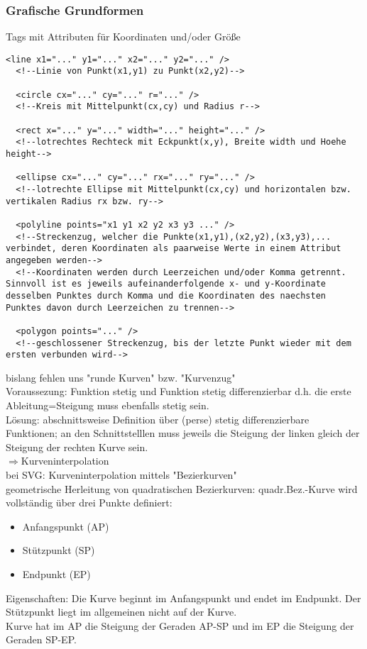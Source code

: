\subsubsection{Grafische Grundformen}
Tags mit Attributen für Koordinaten und/oder Größe
\begin{lstlisting}[caption={Syntax von grafischen Grundformen in SVG}, label={lst:Grundger:SVG}, language={SVG}]
  <line x1="..." y1="..." x2="..." y2="..." />
  <!--Linie von Punkt(x1,y1) zu Punkt(x2,y2)-->
  
  <circle cx="..." cy="..." r="..." />
  <!--Kreis mit Mittelpunkt(cx,cy) und Radius r-->
  
  <rect x="..." y="..." width="..." height="..." />
  <!--lotrechtes Rechteck mit Eckpunkt(x,y), Breite width und Hoehe height-->
  
  <ellipse cx="..." cy="..." rx="..." ry="..." />
  <!--lotrechte Ellipse mit Mittelpunkt(cx,cy) und horizontalen bzw. vertikalen Radius rx bzw. ry-->
  
  <polyline points="x1 y1 x2 y2 x3 y3 ..." />
  <!--Streckenzug, welcher die Punkte(x1,y1),(x2,y2),(x3,y3),... verbindet, deren Koordinaten als paarweise Werte in einem Attribut angegeben werden-->
  <!--Koordinaten werden durch Leerzeichen und/oder Komma getrennt. Sinnvoll ist es jeweils aufeinanderfolgende x- und y-Koordinate desselben Punktes durch Komma und die Koordinaten des naechsten Punktes davon durch Leerzeichen zu trennen-->
  
  <polygon points="..." />
  <!--geschlossener Streckenzug, bis der letzte Punkt wieder mit dem ersten verbunden wird-->
\end{lstlisting}
bislang fehlen uns "runde Kurven" bzw. "Kurvenzug"\\
Voraussezung: Funktion stetig und Funktion stetig differenzierbar d.h. die erste Ableitung=Steigung muss ebenfalls stetig sein.\\
Lösung: abschnittsweise Definition über (perse) stetig differenzierbare Funktionen; an den Schnittstelllen muss jeweils die Steigung der linken gleich der Steigung der rechten Kurve sein.\\
$\Rightarrow$Kurveninterpolation\\
bei SVG: Kurveninterpolation mittels "Bezierkurven"\\
geometrische Herleitung von quadratischen Bezierkurven:
quadr.Bez.-Kurve wird vollständig über drei Punkte definiert:
\begin{itemize}
\item Anfangspunkt (AP)
\item Stützpunkt (SP)
\item Endpunkt (EP)
\end{itemize}
Eigenschaften: Die Kurve beginnt im Anfangspunkt und endet im Endpunkt. Der Stützpunkt liegt im allgemeinen nicht auf der Kurve.\\
Kurve hat im AP die Steigung der Geraden AP-SP und im EP die Steigung der Geraden SP-EP.